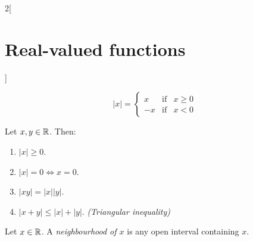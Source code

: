 \documentclass[../../../main.tex]{subfiles}
\begin{document}
\begin{multicols}{2}[\section{Real-valued functions}]
\begin{definition}
\begin{equation*}
            |x|=\left\{
            \begin{array}{ccc}
                x  & \text{if} & x\geq 0 \\
                -x & \text{if} & x<0
            \end{array}
            \right.
        \end{equation*}
    \end{definition}
    \begin{lemma}
        Let $x,y\in\mathbb{R}$. Then:
        \begin{enumerate}
            \item $|x|\geq 0$.
            \item $|x|=0\iff x=0$.
            \item $|xy|=|x||y|$.
            \item $|x+y|\leq|x|+|y|$. \textit{(Triangular inequality)}
        \end{enumerate}
    \end{lemma}
    \begin{definition}
        Let $x\in\mathbb{R}$. A \textit{neighbourhood of $x$} is any open interval containing $x$.
    \end{definition}

\end{multicols}
\end{document}
